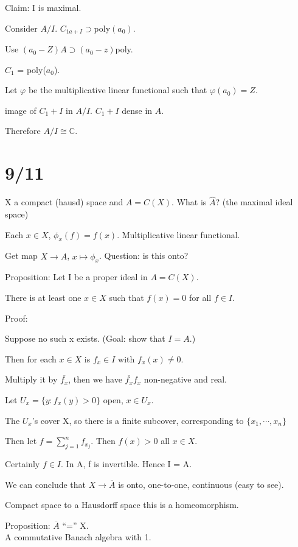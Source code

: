 \documentclass[12pt]{article}
\begin{document}
Claim: I is maximal.

Consider $A/I$.  $C_{1a + I} \supset $poly$(a_0)$.

Use $(a_0 - Z) A \supset (a_0 - z)$poly.

$C_1$ = poly($a_0$).

Let $\varphi$ be the multiplicative linear functional such that $\varphi(a_0) = Z$.

image of $C_1 + I$ in $A/I$. $C_1 + I$ dense in $A$.

Therefore $A/I \cong \mathds{C}$.

\section{9/11}

X a compact (hausd) space and $A = C(X)$.  What is $\hat{A}$? (the maximal ideal space)

Each $x \in X$, $\phi_x(f) = f(x)$.  Multiplicative linear functional.

Get map $X \to \hat{A}$, $x \mapsto \phi_x$.  Question: is this onto?

\noindent
Proposition: Let I be a proper ideal in $A = C(X)$.

There is at least one $x \in X$ such that $f(x) = 0$ for all $f \in I$.

\noindent
Proof:

Suppose no such x exists. (Goal: show that $I = A$.)

Then for each $x \in X$ is $f_x \in I$ with $f_x(x) \neq 0$.

Multiply it by $\overline{f_x}$, then we have $\overline{f_x}f_x$ non-negative and real.

Let $U_x = \{y : f_x(y) > 0 \}$ open, $x \in U_x$.

The $U_x$'s cover X, so there is a finite subcover, corresponding to $\{x_1, \cdots, x_n\}$

Then let $f = \sum_{j = 1}^nf_{x_j}$.  Then $f(x) > 0$ all $x \in X$.

Certainly $f \in I$.  In A, f is invertible.  Hence I = A.

\noindent
We can conclude that $X \to \overline{A}$ is onto, one-to-one, continuous (easy to see).

Compact space to a Hausdorff space this is a homeomorphism.

\noindent
Proposition: $\overline{A}$ ``='' X.\\

\noindent
A commutative Banach algebra with 1.
\end{document}

